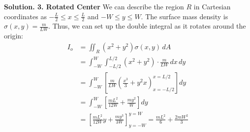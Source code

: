 \documentclass[11pt]{report}
\begin{document}
\begin{example}
    \textbf{Solution. 3. Rotated Center} We can describe the region $R$ in Cartesian coordinates as $-\frac{L}{2} \le x \le \frac{L}{2}$ and $-W \le y \le W$. The surface mass density is $\sigma(x,y) = \frac{m}{LW}$. Thus, we can set up the double integral as it rotates around the origin:
    \begin{equation*}
    \begin{split}
        I_o &= \iint_R (x^2 + y^2) \sigma(x,y) \, dA \\
        &= \int_{-W}^W \int_{-L/2}^{L/2} (x^2 + y^2) \cdot \frac{m}{LW} \, dx \, dy \\
        &= \int_{-W}^W \left[ \frac{m}{LW} \left( \frac{x^3}{3} + y^2 x \right)_{x=-L/2}^{x=L/2} \right] dy \\
        &= \int_{-W}^W \left[ \frac{mL^2}{12W} + \frac{my^2}{W} \right] dy \\
        &= \left[ \frac{mL^2}{12W} y + \frac{my^3}{3W} \right]_{y=-W}^{y=W} = \frac{mL^2}{6} + \frac{2mW^2}{3}
    \end{split}
    \end{equation*}
\end{example}
\end{document}

